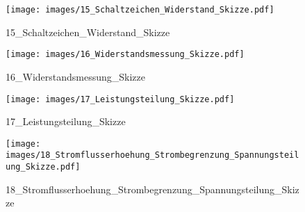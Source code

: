 %
%
\begin{figure}[!hb]%
    \centering
  \texttt{[image: images/15\_Schaltzeichen\_Widerstand\_Skizze.pdf]}%
  \caption{15_Schaltzeichen_Widerstand_Skizze}%
\end{figure}

%
%
\begin{figure}[!hb]%
    \centering
  \texttt{[image: images/16\_Widerstandsmessung\_Skizze.pdf]}%
  \caption{16_Widerstandsmessung_Skizze}%
\end{figure}

%
%
\begin{figure}[!hb]%
    \centering
  \texttt{[image: images/17\_Leistungsteilung\_Skizze.pdf]}%
  \caption{17_Leistungsteilung_Skizze}%
\end{figure}

%
%
\begin{figure}[!hb]%
    \centering
  \texttt{[image: images/18\_Stromflusserhoehung\_Strombegrenzung\_Spannungsteilung\_Skizze.pdf]}%
  \caption{18_Stromflusserhoehung_Strombegrenzung_Spannungsteilung_Skizze}%
\end{figure}

